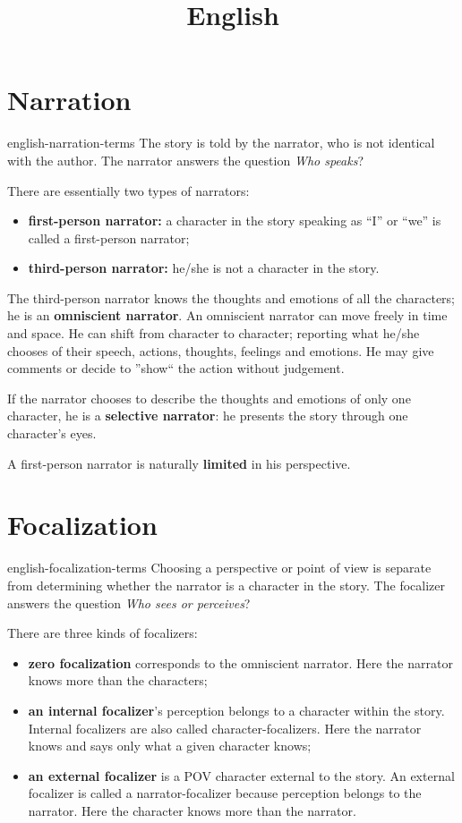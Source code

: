 \documentclass[preview]{standalone}
\begin{document}
\title{English}
\genpage

\section{Narration}

\begin{snippet}{english-narration-terms}
The story is told by the narrator, who is not identical with the author. The narrator answers the
question \textit{Who speaks}?

There are essentially two types of narrators:
\begin{itemize}
    \item \textbf{first-person narrator:}
        a character in the story speaking as “I” or “we” is called a first-person
        narrator;
    \item \textbf{third-person narrator:}
        he/she is not a character in the story.
\end{itemize}

The third-person narrator knows the thoughts and emotions of all the characters; he is an
\textbf{omniscient narrator}. An omniscient narrator can move freely in time and space. He can shift from
character to character; reporting what he/she chooses of their speech, actions, thoughts, feelings
and emotions. He may give comments or decide to ''show`` the action without judgement.

If the narrator chooses to describe the thoughts and emotions of only one character, he is a \textbf{selective
narrator}: he presents the story through one character's eyes.

A first-person narrator is naturally \textbf{limited} in his perspective.
\end{snippet}

\section{Focalization}

\begin{snippet}{english-focalization-terms}
Choosing a perspective or point of view is separate from determining whether the narrator is a
character in the story. The focalizer answers the question \textit{Who sees or perceives}?

There are three kinds of focalizers:
\begin{itemize}
    \item \textbf{zero focalization} corresponds to the omniscient narrator. Here the narrator knows more
    than the characters;
    \item \textbf{an internal focalizer}'s perception belongs to a character within the story. Internal focalizers
    are also called character-focalizers. Here the narrator knows and says only what a given
    character knows;
    \item \textbf{an external focalizer} is a POV character external to the story. An external focalizer is called
    a narrator-focalizer because perception belongs to the narrator. Here the character knows
    more than the narrator.
\end{itemize}
\end{snippet}
\end{document}
